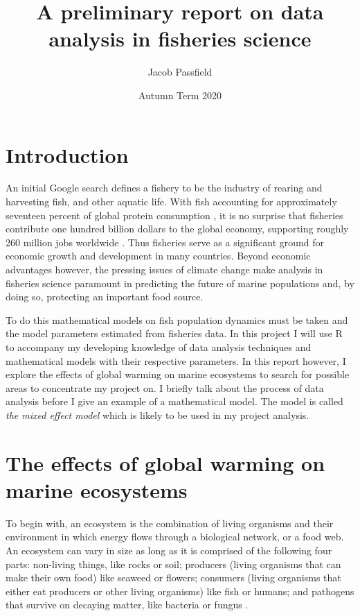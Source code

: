 \documentclass{article}
\title{\huge{\bf{A preliminary report on data analysis in fisheries science}}}
\author{Jacob Passfield}
\date{Autumn Term 2020}
\begin{document}
\maketitle

\section{Introduction}

An initial Google search defines a fishery to be the industry of rearing and harvesting fish, and other aquatic life. With fish accounting for approximately seventeen percent of global protein consumption \cite{1}, it is no surprise that fisheries contribute one hundred billion dollars to the global economy, supporting roughly 260 million jobs worldwide \cite{2}. Thus fisheries serve as a significant ground for economic growth and development in many countries. Beyond economic advantages however, the pressing issues of climate change make analysis in fisheries science paramount in predicting the future of marine populations and, by doing so, protecting an important food source. 

To do this mathematical models on fish population dynamics must be taken and the model parameters estimated from fisheries data. In this project I will use R to accompany my developing knowledge of data analysis techniques and mathematical models with their respective parameters. In this report however, I explore the effects of global warming on marine ecosystems to search for possible areas to concentrate my project on. I briefly talk about the process of data analysis before I give an example of a mathematical model. The model is called \textit{the mixed effect model} which is likely to be used in my project analysis.

\section{The effects of global warming on marine ecosystems}

To begin with, an ecosystem is the combination of living organisms and their environment in which energy flows through a biological network, or a food web. An ecosystem can vary in size as long as it is comprised of the following four parts: non-living things, like rocks or soil; producers (living organisms that can make their own food) like seaweed or flowers; consumers (living organisms that either eat producers or other living organisms) like fish or humans; and pathogens that survive on decaying matter, like bacteria or fungus \cite{3}. 
\end{document}

